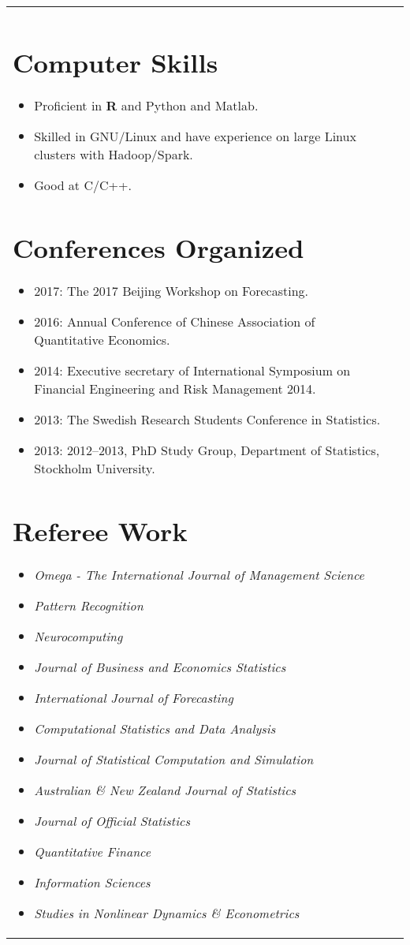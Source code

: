 \documentclass[twoside,a4paper,10.5pt]{article}
\begin{document}
\begin{tabular}{ll}
\begin{itemize}
\end{itemize}


\section*{Computer Skills}
\begin{itemize}
\item Proficient in \textbf{R} and Python and Matlab.

\item Skilled in GNU/Linux and have experience on large Linux clusters with Hadoop/Spark.

\item Good at C/C++.
\end{itemize}

\section*{Conferences Organized}

\begin{itemize}
\item 2017: The 2017 Beijing Workshop on Forecasting.
\item 2016: Annual Conference of Chinese Association of Quantitative Economics.
\item 2014: Executive secretary of International Symposium on Financial Engineering and Risk Management 2014.

\item 2013: The Swedish Research Students Conference in Statistics.
\item 2013: 2012–2013, PhD Study Group, Department of Statistics, Stockholm University.
\end{itemize}

\section*{Referee Work}
\begin{itemize}
\item \emph{Omega - The International Journal of Management Science}
\item \emph{Pattern Recognition}
\item \emph{Neurocomputing}
\item \emph{Journal of Business and Economics Statistics}
\item \emph{International Journal of Forecasting}
\item \emph{Computational Statistics and Data Analysis}
\item \emph{Journal of Statistical Computation and Simulation}
\item \emph{Australian \& New Zealand Journal of Statistics}
\item \emph{Journal of Official Statistics}
\item \emph{Quantitative Finance}
\item \emph{Information Sciences}
\item \emph{Studies in Nonlinear Dynamics \& Econometrics}


\end{itemize}
\end{tabular}
\end{document}
